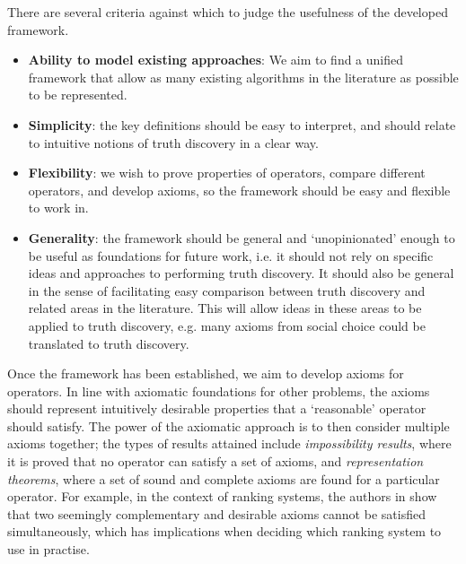 \documentclass[../main.tex]{subfiles}
\begin{document}
There are several criteria against which to judge the usefulness of the
developed framework.
\begin{itemize}

\item \textbf{Ability to model existing approaches}: We aim to find a unified
framework that allow as many existing algorithms in the literature as possible
to be represented.

\item \textbf{Simplicity}: the key definitions should be easy to interpret, and
should relate to intuitive notions of truth discovery in a clear way.

\item \textbf{Flexibility}: we wish to prove properties of operators, compare
different operators, and develop axioms, so the framework should be easy and
flexible to work in.

\item \textbf{Generality}: the framework should be general and `unopinionated'
enough to be useful as foundations for future work, i.e. it should not rely on
specific ideas and approaches to performing truth discovery. It should also be
general in the sense of facilitating easy comparison between truth discovery
and related areas in the literature. This will allow ideas in these areas to be
applied to truth discovery, e.g. many axioms from social choice could be
translated to truth discovery.

\end{itemize}

Once the framework has been established, we aim to develop axioms for
operators. In line with axiomatic foundations for other problems, the axioms
should represent intuitively desirable properties that a `reasonable' operator
should satisfy. The power of the axiomatic approach is to then consider
multiple axioms together; the types of results attained include
\emph{impossibility results}, where it is proved that no
operator\footnotemark{} can satisfy a set of axioms, and \emph{representation
theorems}, where a set of sound and complete axioms are found for a particular
operator. For example, in the context of ranking systems, the authors in
\cite{altman_foundations} show that two seemingly complementary and desirable
axioms cannot be satisfied simultaneously, which has implications when deciding
which ranking system to use in practise.

\end{document}

